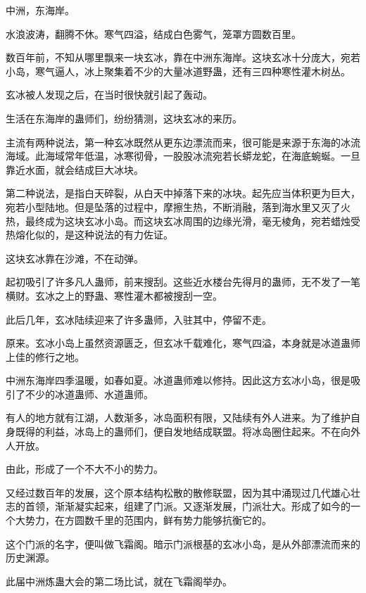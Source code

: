 
\begin{this_body}



中洲，东海岸。

水浪波涛，翻腾不休。寒气四溢，结成白色雾气，笼罩方圆数百里。

数百年前，不知从哪里飘来一块玄冰，靠在中洲东海岸。这块玄冰十分庞大，宛若小岛，寒气逼人，冰上聚集着不少的大量冰道野蛊，还有三四种寒性灌木树丛。

玄冰被人发现之后，在当时很快就引起了轰动。

生活在东海岸的蛊师们，纷纷猜测，这块玄冰的来历。

主流有两种说法，第一种玄冰既然从更东边漂流而来，很可能是来源于东海的冰流海域。此海域常年低温，冰寒彻骨，一股股冰流宛若长蟒龙蛇，在海底蜿蜒。一旦靠近水面，就会结成巨大冰块。

第二种说法，是指白天碎裂，从白天中掉落下来的冰块。起先应当体积更为巨大，宛若小型陆地。但是坠落的过程中，摩擦生热，不断消融，落到海水里又灭了火热，最终成为这块玄冰小岛。而这块玄冰周围的边缘光滑，毫无棱角，宛若蜡烛受热熔化似的，是这种说法的有力佐证。

这块玄冰靠在沙滩，不在动弹。

起初吸引了许多凡人蛊师，前来搜刮。这些近水楼台先得月的蛊师，无不发了一笔横财。玄冰之上的野蛊、寒性灌木都被搜刮一空。

此后几年，玄冰陆续迎来了许多蛊师，入驻其中，停留不走。

原来。玄冰小岛上虽然资源匮乏，但玄冰千载难化，寒气四溢，本身就是冰道蛊师上佳的修行之地。

中洲东海岸四季温暖，如春如夏。冰道蛊师难以修持。因此这方玄冰小岛，很是吸引了不少的冰道蛊师、水道蛊师。

有人的地方就有江湖，人数渐多，冰岛面积有限，又陆续有外人进来。为了维护自身既得的利益，冰岛上的蛊师们，便自发地结成联盟。将冰岛圈住起来。不在向外人开放。

由此，形成了一个不大不小的势力。

又经过数百年的发展，这个原本结构松散的散修联盟，因为其中涌现过几代雄心壮志的首领，渐渐凝实起来，组建了门派。又逐渐发展，门派壮大。形成了如今的一个大势力，在方圆数千里的范围内，鲜有势力能够抗衡它的。

这个门派的名字，便叫做飞霜阁。暗示门派根基的玄冰小岛，是从外部漂流而来的历史渊源。

此届中洲炼蛊大会的第二场比试，就在飞霜阁举办。


\end{this_body}
